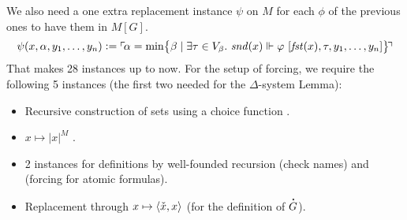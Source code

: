 We also need a one extra replacement instance $\psi$ on $M$ for each
$\phi$ of the
previous ones to have them in $M[G]$.
\[
  \psi(x,\alpha,y_1,\dots,y_n) \mathrel{\mathop:}= \ulcorner{\!\alpha = \min \bigl\{
    \beta \mid \exists\tau\in V_\beta.\  \mathit{snd}(x) \Vdash\varphi\ [\mathit{fst}(x),\tau,y_1,\dots,y_n]\bigr\}\!}\urcorner
\]
That makes 28 instances up to now. For the setup of forcing, we
require the following 5 instances (the first two needed for the $\Delta$-system Lemma):

\begin{itemize}
\item Recursive construction of sets using a choice function
  .
\item $x\mapsto |x|^M$
  .
\item 2 instances for definitions by well-founded recursion  (check
  names) and  (forcing for atomic formulas).
\item Replacement through $x\mapsto \langle\check{x},x\rangle$
   (for the
  definition of $\punto{G}$).
\end{itemize}

